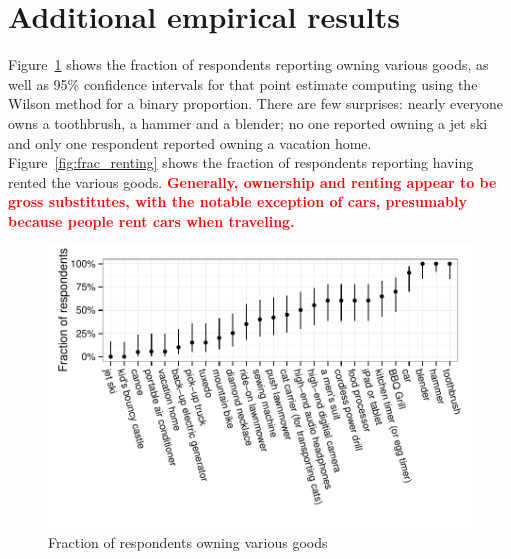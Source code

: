 \documentclass[11pt]{article}
\newcommand{\important}[1]{\textcolor{red}{\textbf{#1}}}
\newcommand{\important}[1]{#1}
\begin{document}
\section{Additional empirical results} \label{sec:additional_results}

Figure~\ref{fig:frac_owning} shows the fraction of respondents reporting owning various goods, as well as 95\% confidence intervals for that point estimate computing using the Wilson method for a binary proportion.    
There are few surprises: nearly everyone owns a toothbrush, a hammer and a blender; no one reported owning a jet ski and only one respondent reported owning a vacation home.
Figure~\ref{fig:frac_renting} shows the fraction of respondents reporting having rented the various goods. 
\important{Generally, ownership and renting appear to be gross substitutes, with the notable exception of cars, presumably because people rent cars when traveling.}

\begin{figure}
\centering 
\caption{Fraction of respondents owning various goods \label{fig:frac_owning} }
\begin{minipage}{0.90 \linewidth}
\includegraphics[width = \linewidth]{./plots/ownership_fractions.pdf} 
\end{minipage} 
\end{figure} 
\end{document}

